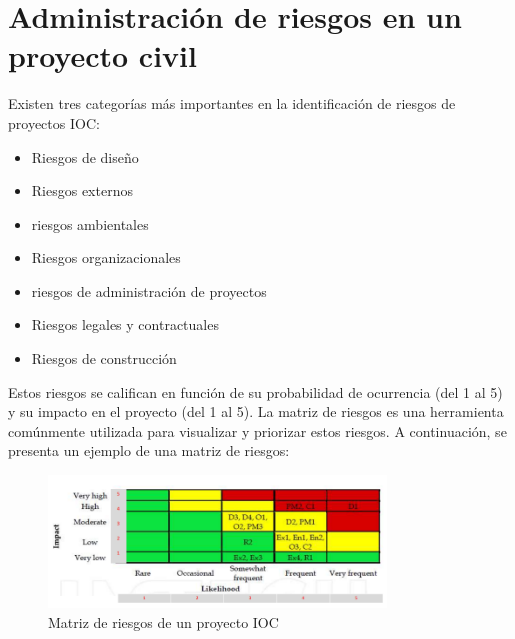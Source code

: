 \section{Administración de riesgos en un proyecto civil}

Existen tres categorías más importantes en la identificación de riesgos de proyectos IOC:
\begin{itemize}
    \item Riesgos de diseño
    \item Riesgos externos
    \item riesgos ambientales
    \item Riesgos organizacionales
    \item riesgos de administración de proyectos
    \item Riesgos legales y contractuales
    \item Riesgos de construcción
\end{itemize}

Estos riesgos se califican en función de su probabilidad de ocurrencia (del 1 al 5) y su impacto en el proyecto (del 1 al 5). La matriz de riesgos es una herramienta comúnmente utilizada para visualizar y priorizar estos riesgos.
A continuación, se presenta un ejemplo de una matriz de riesgos:
\begin{figure}[h]
    \centering
    \includegraphics[width=0.8\textwidth]{Graficos/matriz.png}
    \caption{Matriz de riesgos de un proyecto IOC}
    \label{fig:matriz_riesgos}
\end{figure} 

